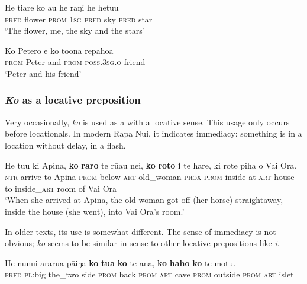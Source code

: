 \ea\label{ex:4.322}
\gll He tiare ko au he raŋi he hetu{\ꞌ}u\\
\textsc{pred} flower \textsc{prom} \textsc{1sg} \textsc{pred} sky \textsc{pred} star\\

\glt 
‘The flower, me, the sky and the stars’ \textstyleExampleref{[R222.000]} 
\z

\ea\label{ex:4.323}
\gll Ko Petero {\ꞌ}e ko tō{\ꞌ}ona repahoa\\
\textsc{prom} Peter and \textsc{prom} \textsc{poss.3sg.o} friend\\

\glt 
‘Peter and his friend’ \textstyleExampleref{[R428.000]} 
\z

\subsubsection{\textit{Ko} as a locative preposition}\label{sec:4.7.11.2}

Very occasionally, \textit{ko} is used as a  with a locative sense. This usage only occurs before locationals. In modern Rapa Nui, it indicates immediacy: something is in a location without delay, in a flash.

\ea\label{ex:4.324}
\gll He tu{\ꞌ}u ki {\ꞌ}Apina, \textbf{ko} \textbf{raro} te rū{\ꞌ}au nei, \textbf{ko} \textbf{roto} \textbf{i} te hare, ki rote piha o Vai Ora. \\
\textsc{ntr} arrive to Apina \textsc{prom} below \textsc{art} old\_woman \textsc{prox} \textsc{prom} inside at \textsc{art} house to inside\_\textsc{art} room of Vai Ora \\

\glt
‘When she arrived at Apina, the old woman got off (her horse) straightaway, inside the house (she went), into Vai Ora’s room.’ \textstyleExampleref{[R301.111]} 
\z

In older texts, its use is somewhat different. The sense of immediacy is not obvious; \textit{ko} seems to be similar in sense to other locative prepositions like \textit{{\ꞌ}i}.

\ea\label{ex:4.325}
\gll He nunui ararua pā{\ꞌ}iŋa \textbf{ko} \textbf{tu{\ꞌ}a} \textbf{ko} te {\ꞌ}ana, \textbf{ko} \textbf{haho} \textbf{ko} te motu.\\
\textsc{pred} \textsc{pl}:big the\_two side \textsc{prom} back \textsc{prom} \textsc{art} cave \textsc{prom} outside  \textsc{prom} \textsc{art} islet\\

